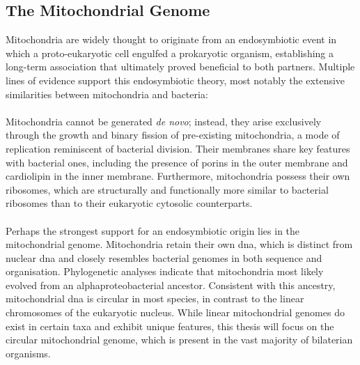 \subsection{The Mitochondrial Genome}

Mitochondria are widely thought to originate from an endosymbiotic event in which a proto-eukaryotic cell engulfed a prokaryotic organism, establishing a long-term association that ultimately proved beneficial to both partners\cite{harrington_mitochondria_2023, andrieux_mitochondria_2021, casanova_mitochondria_2023, zachar_endosymbiosis_2020}. Multiple lines of evidence support this endosymbiotic theory, most notably the extensive similarities between mitochondria and bacteria:
\\
\\
Mitochondria cannot be generated \textit{de novo}; instead, they arise exclusively through the growth and binary fission of pre-existing mitochondria, a mode of replication reminiscent of bacterial division\cite{kraus_function_2021}. Their membranes share key features with bacterial ones, including the presence of porins in the outer membrane\cite{takeda_oligomer-based_2025} and cardiolipin in the inner membrane\cite{geiger_multiple_2023}. Furthermore, mitochondria possess their own ribosomes, which are structurally and functionally more similar to bacterial ribosomes than to their eukaryotic cytosolic counterparts\cite{seely_mechanisms_2022}.
\\
\\
Perhaps the strongest support for an endosymbiotic origin lies in the mitochondrial genome. Mitochondria retain their own \gls{dna}, which is distinct from nuclear \gls{dna} and closely resembles bacterial genomes in both sequence and organisation\cite{geiger_multiple_2023}. Phylogenetic analyses indicate that mitochondria most likely evolved from an alphaproteobacterial ancestor\cite{geiger_multiple_2023}. Consistent with this ancestry, mitochondrial \gls{dna} is circular in most species, in contrast to the linear chromosomes of the eukaryotic nucleus\cite{geiger_multiple_2023}. While linear mitochondrial genomes do exist in certain taxa and exhibit unique features\cite{stampar_linear_2019}, this thesis will focus on the circular mitochondrial genome, which is present in the vast majority of bilaterian organisms\cite{stampar_linear_2019}.
\\
\\
